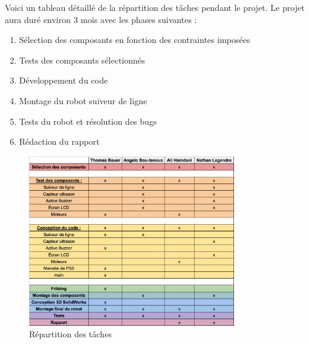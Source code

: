 Voici un tableau détaillé de la répartition des tâches pendant le projet.
Le projet aura duré environ 3 mois avec les phases suivantes :
\begin{enumerate}
    \item Sélection des composants en fonction des contraintes imposées
    \item Tests des composants sélectionnés
    \item Développement du code
    \item Montage du robot suiveur de ligne
    \item Tests du robot et résolution des bugs
    \item Rédaction du rapport
\end{enumerate}

\begin{figure}[h]
    \centering
    \includegraphics[width=0.8\textwidth]{images/members_tasks.png}
    \caption{Répartition des tâches}
    \label{fig:Répartition des tâches}
\end{figure}

\newpage

